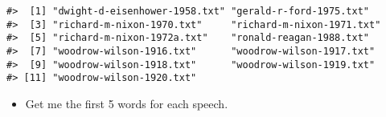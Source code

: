 \documentclass[]{book}
\newenvironment{Shaded}{\begin{snugshade}}{\end{snugshade}}
\newcommand{\DataTypeTok}[1]{\textcolor[rgb]{0.13,0.29,0.53}{#1}}
\newcommand{\DecValTok}[1]{\textcolor[rgb]{0.00,0.00,0.81}{#1}}
\newcommand{\KeywordTok}[1]{\textcolor[rgb]{0.13,0.29,0.53}{\textbf{#1}}}
\newcommand{\NormalTok}[1]{#1}
\newcommand{\OperatorTok}[1]{\textcolor[rgb]{0.81,0.36,0.00}{\textbf{#1}}}
\newcommand{\StringTok}[1]{\textcolor[rgb]{0.31,0.60,0.02}{#1}}
\providecommand{\tightlist}{%
  \setlength{\itemsep}{0pt}\setlength{\parskip}{0pt}}
\begin{document}
\begin{verbatim}
#>  [1] "dwight-d-eisenhower-1958.txt" "gerald-r-ford-1975.txt"      
#>  [3] "richard-m-nixon-1970.txt"     "richard-m-nixon-1971.txt"    
#>  [5] "richard-m-nixon-1972a.txt"    "ronald-reagan-1988.txt"      
#>  [7] "woodrow-wilson-1916.txt"      "woodrow-wilson-1917.txt"     
#>  [9] "woodrow-wilson-1918.txt"      "woodrow-wilson-1919.txt"     
#> [11] "woodrow-wilson-1920.txt"
\end{verbatim}

\begin{itemize}
\tightlist
\item
  Get me the first 5 words for each speech.
\end{itemize}

\begin{Shaded}
\end{Shaded}
\end{document}
